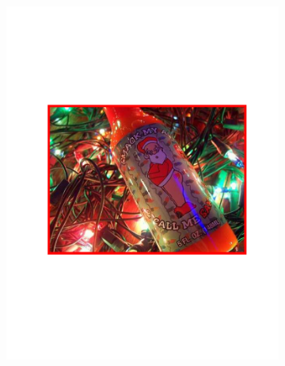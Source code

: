 \begin{figure}[hbt]
\begin{subfigure}[b]{0.45\textwidth}
        \includegraphics[width=\textwidth]{FP2}
        \caption{}
        \label{fig:detfp2}
    \end{subfigure}
    

\end{figure}
